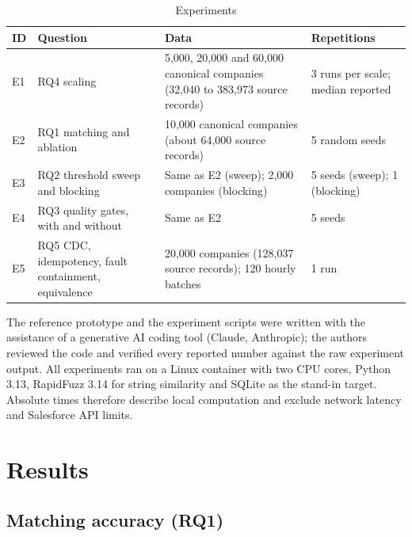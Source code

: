 \begin{table}[!t]
\centering
\caption{Experiments}
\label{tab:3}
\setlength{\tabcolsep}{4pt}
\renewcommand{\arraystretch}{1.15}
\footnotesize
\begin{tabular}{>{\raggedright\arraybackslash\hspace{0pt}}p{}>{\raggedright\arraybackslash\hspace{0pt}}p{}>{\raggedright\arraybackslash\hspace{0pt}}p{}>{\raggedright\arraybackslash\hspace{0pt}}p{}}
\hline
\textbf{ID} & \textbf{Question} & \textbf{Data} & \textbf{Repetitions} \\
\hline
E1 & RQ4 scaling & 5,000, 20,000 and 60,000 canonical companies (32,040 to 383,973 source records) & 3 runs per scale; median reported \\
E2 & RQ1 matching and ablation & 10,000 canonical companies (about 64,000 source records) & 5 random seeds \\
E3 & RQ2 threshold sweep and blocking & Same as E2 (sweep); 2,000 companies (blocking) & 5 seeds (sweep); 1 (blocking) \\
E4 & RQ3 quality gates, with and without & Same as E2 & 5 seeds \\
E5 & RQ5 CDC, idempotency, fault containment, equivalence & 20,000 companies (128,037 source records); 120 hourly batches & 1 run \\
\hline
\end{tabular}
\end{table}


The reference prototype and the experiment scripts were written with the assistance of a generative AI coding tool (Claude, Anthropic); the authors reviewed the code and verified every reported number against the raw experiment output. All experiments ran on a Linux container with two CPU cores, Python 3.13, RapidFuzz 3.14 for string similarity and SQLite as the stand-in target. Absolute times therefore describe local computation and exclude network latency and Salesforce API limits.

\section{Results}\label{sec:5}

\subsection{Matching accuracy (RQ1)}\label{sec:5.1}

